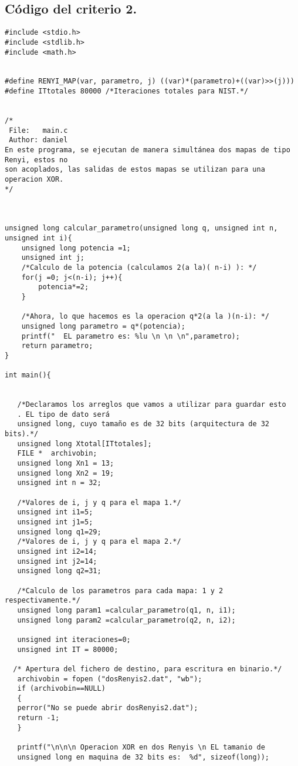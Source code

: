 \documentclass[12pt,3p]{elsarticle}
\begin{document}
\subsection{Código del criterio 2.}
\begin{verbatim}
#include <stdio.h>
#include <stdlib.h>
#include <math.h>


#define RENYI_MAP(var, parametro, j) ((var)*(parametro)+((var)>>(j)))
#define ITtotales 80000 /*Iteraciones totales para NIST.*/


/*
 File:   main.c
 Author: daniel
En este programa, se ejecutan de manera simultánea dos mapas de tipo Renyi, estos no
son acoplados, las salidas de estos mapas se utilizan para una operacion XOR.
*/



unsigned long calcular_parametro(unsigned long q, unsigned int n, unsigned int i){    
    unsigned long potencia =1;
    unsigned int j;
    /*Calculo de la potencia (calculamos 2(a la)( n-i) ): */
    for(j =0; j<(n-i); j++){
        potencia*=2;
    }

    /*Ahora, lo que hacemos es la operacion q*2(a la )(n-i): */
    unsigned long parametro = q*(potencia);
    printf("  EL parametro es: %lu \n \n \n",parametro);
    return parametro;
}

int main(){
 
   
   /*Declaramos los arreglos que vamos a utilizar para guardar esto
   . EL tipo de dato será
   unsigned long, cuyo tamaño es de 32 bits (arquitectura de 32 bits).*/
   unsigned long Xtotal[ITtotales]; 
   FILE *  archivobin; 
   unsigned long Xn1 = 13;
   unsigned long Xn2 = 19;
   unsigned int n = 32;

   /*Valores de i, j y q para el mapa 1.*/
   unsigned int i1=5; 
   unsigned int j1=5; 
   unsigned long q1=29;
   /*Valores de i, j y q para el mapa 2.*/
   unsigned int i2=14; 
   unsigned int j2=14; 
   unsigned long q2=31;
 
   /*Calculo de los parametros para cada mapa: 1 y 2 respectivamente.*/
   unsigned long param1 =calcular_parametro(q1, n, i1);
   unsigned long param2 =calcular_parametro(q2, n, i2);
 
   unsigned int iteraciones=0;
   unsigned int IT = 80000;

  /* Apertura del fichero de destino, para escritura en binario.*/
   archivobin = fopen ("dosRenyis2.dat", "wb");
   if (archivobin==NULL)
   {
   perror("No se puede abrir dosRenyis2.dat");
   return -1;
   }
   
   printf("\n\n\n Operacion XOR en dos Renyis \n EL tamanio de 
   unsigned long en maquina de 32 bits es:  %d", sizeof(long));




\end{verbatim}
\end{document}

